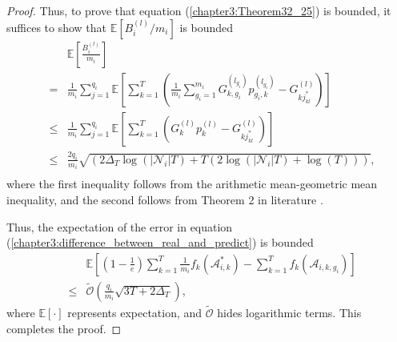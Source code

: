 \begin{proof}
Thus, to prove that equation (\ref{chapter3:Theorem32_25}) is bounded, it suffices to show that $\mathbb{E} [B_i^{(l)}/m_i]$ is bounded
\begin{eqnarray}\label{equ4.8}
&&\mathbb{E} \left[ \frac{B_i^{(l)}}{m_i} \right] \nonumber\\
&=& \frac{1}{m_i} \sum_{j=1}^{q_i} \mathbb{E} \left[ \sum_{k=1}^T \left( \frac{1}{m_i} \sum^{m_i}_{g_i=1} G_{k,g_i}^{\left( l_{g_i} \right)} p_{g_i,k}^{\left( l_{g_i} \right)} - G_{kj_{kl}^{*}}^{\left( l \right)} \right) \right] 
\nonumber\\
&\le& \frac{1}{m_i} \sum_{j=1}^{q_i} \mathbb{E} \left[ \sum_{k=1}^T ( G_{k}^{\left( l \right)} p_{k}^{\left( l \right)} - G_{kj_{kl}^{*}}^{\left( l \right)} ) \right]  
\nonumber\\
&\le& \frac{2q_i}{m_i} \sqrt{{( 2\varDelta _T\log ( |\mathcal{N}_i|T ) + T ( 2\log ( |\mathcal{N}_i|T ) + \log ( T ) ) )}},\nonumber\\
\end{eqnarray}
where the first inequality follows from the arithmetic mean-geometric mean inequality, and the second follows from Theorem 2 in literature \cite{Suo2024Security}.

Thus, the expectation of the error in equation (\ref{chapter3:difference_between_real_and_predict}) is bounded
\begin{eqnarray}\label{chapter3:dynamic_expextation}
   && \mathbb{E} \left[ \left( 1 - \frac{1}{e} \right) \sum_{k=1}^T{\frac{1}{m_i} f_k\left( \mathcal{A}_{i,k}^{*} \right)} - \sum_{k=1}^T{f_k( \mathcal{A}_{i,k,g_i} )} \right]  \nonumber\\
&\le& \tilde{\mathcal{O}} \left( \frac{q_i}{m_i} \sqrt{3T+2\varDelta _T} \right),
\end{eqnarray}
where $\mathbb{E} [\cdot]$ represents expectation, and $\tilde{\mathcal{O}}$ hides logarithmic terms.
This completes the proof.
\end{proof}





